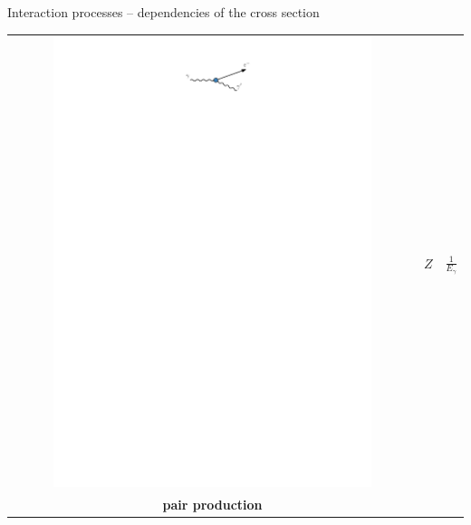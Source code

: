 \documentclass[11pt,xcolor=dvipsnames,professionalfonts]{beamer}
\begin{document}
\begin{frame}{Interaction processes -- dependencies of the cross section}
\begin{center}
\begin{tabular}{ccc}
\begin{minipage}{0.3\textwidth}
				\includegraphics[width=0.8\textwidth]{./figures/compton_intro.pdf} 
				
				\vspace{0.4cm}
			\end{minipage} & $Z$ & $\frac{1}{E_\gamma}$\\
			
			\begin{minipage}{0.3\textwidth}
				\centering
				\textbf{pair production}
				
				\vspace{0.1cm}
				

\end{minipage}
\end{tabular}
\end{center}
\end{frame}
\end{document}
